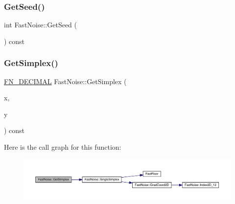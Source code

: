 \subsubsection{\texorpdfstring{Get\+Seed()}{GetSeed()}}
{\footnotesize\ttfamily int Fast\+Noise\+::\+Get\+Seed (\begin{DoxyParamCaption}{ }\end{DoxyParamCaption}) const\hspace{0.3cm}{\ttfamily [inline]}}

\mbox{\label{class_fast_noise_a465c9c71c7a2b9f1e8093d85a6c0de4a}} 
\subsubsection{\texorpdfstring{Get\+Simplex()}{GetSimplex()}\hspace{0.1cm}{\footnotesize\ttfamily [1/3]}}
{\footnotesize\ttfamily \mbox{\hyperlink{_fast_noise_8h_a75a9ef6d2541c4921815b885bfd449c3}{F\+N\+\_\+\+D\+E\+C\+I\+M\+AL}} Fast\+Noise\+::\+Get\+Simplex (\begin{DoxyParamCaption}\item[{\mbox{\hyperlink{_fast_noise_8h_a75a9ef6d2541c4921815b885bfd449c3}{F\+N\+\_\+\+D\+E\+C\+I\+M\+AL}}}]{x,  }\item[{\mbox{\hyperlink{_fast_noise_8h_a75a9ef6d2541c4921815b885bfd449c3}{F\+N\+\_\+\+D\+E\+C\+I\+M\+AL}}}]{y }\end{DoxyParamCaption}) const}

Here is the call graph for this function\+:
\nopagebreak
\begin{figure}[H]
\begin{center}
\leavevmode
\includegraphics[width=350pt]{class_fast_noise_a465c9c71c7a2b9f1e8093d85a6c0de4a_cgraph}
\end{center}
\end{figure}
\mbox{\label{class_fast_noise_a4ab5e306f72c428fef0e69be3166c07d}} 
